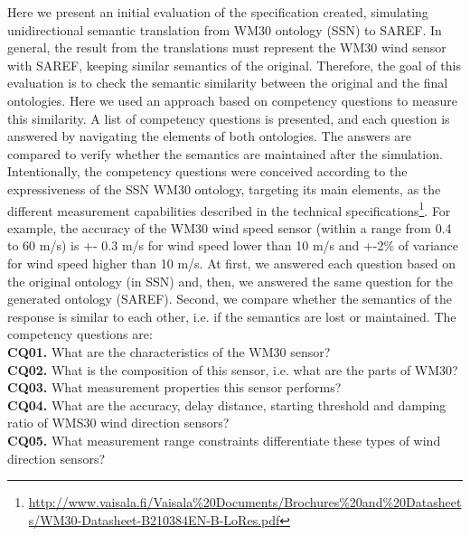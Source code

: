 \documentclass{sig-alternate-05-2015}
\begin{document}
Here we present an initial evaluation of the specification created, simulating unidirectional semantic translation from WM30 ontology (SSN) to SAREF. In general, the result from the translations must represent the WM30 wind sensor with SAREF, keeping similar semantics of the original. Therefore, the goal of this evaluation is to check the semantic similarity between the original and the final ontologies. Here we used an approach based on competency questions to measure this similarity. A list of competency questions is presented, and each question is answered by navigating the elements of both ontologies. The answers are compared to verify whether the semantics are maintained after the simulation. Intentionally, the competency questions were conceived according to the expressiveness of the SSN WM30 ontology, targeting its main elements, as the different measurement capabilities described in the technical specifications\footnote{\url{http://www.vaisala.fi/Vaisala\%20Documents/Brochures\%20and\%20Datasheets/WM30-Datasheet-B210384EN-B-LoRes.pdf}}. For example, the accuracy of the WM30 wind speed sensor (within a range from 0.4 to 60 m/s) is +- 0.3 m/s for wind speed lower than 10 m/s and +-2\% of variance for wind speed higher than 10 m/s. At first, we answered each question based on the original ontology (in SSN) and, then, we answered the same question for the generated ontology (SAREF). Second, we compare whether the semantics of the response is similar to each other, i.e. if the semantics are lost or maintained. The competency questions are: 
\\\textbf{CQ01.} What are the characteristics of the WM30 sensor? 
\\\textbf{CQ02.} What is the composition of this sensor, i.e. what are the parts of WM30?
\\\textbf{CQ03.} What measurement properties this sensor performs?
\\\textbf{CQ04.} What are the accuracy, delay distance, starting threshold and damping ratio of WMS30 wind direction sensors? 
\\\textbf{CQ05.} What measurement range constraints differentiate these types of wind direction sensors?
\end{document}
